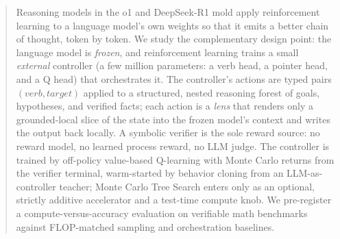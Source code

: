 \begin{abstract}
Reasoning models in the o1 and DeepSeek-R1 mold apply reinforcement learning
to a language model's own weights so that it emits a better chain of thought,
token by token. We study the complementary design point: the language model is
\emph{frozen}, and reinforcement learning trains a small \emph{external}
controller (a few million parameters: a verb head, a pointer head, and a Q
head) that orchestrates it. The controller's actions are typed pairs
$(\textit{verb}, \textit{target})$ applied to a structured, nested reasoning
forest of goals, hypotheses, and verified facts; each action is a
\emph{lens} that renders only a grounded-local slice of the state into the
frozen model's context and writes the output back locally. A symbolic
verifier is the sole reward source: no reward model, no learned process
reward, no LLM judge. The controller is trained by off-policy value-based
Q-learning with Monte Carlo returns from the verifier terminal, warm-started
by behavior cloning from an LLM-as-controller teacher; Monte Carlo Tree
Search enters only as an optional, strictly additive accelerator and a
test-time compute knob. We pre-register a compute-versus-accuracy evaluation
on verifiable math benchmarks against FLOP-matched sampling and
orchestration baselines. 
\end{abstract}
